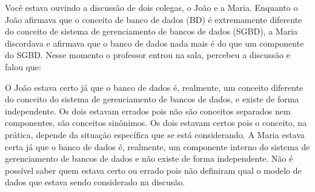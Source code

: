 \documentclass[12pt, addpoints]{exam}
\begin{document}
\begin{questions}
\question
Você estava ouvindo a discussão de dois colegas, o João e a Maria. Enquanto o
João afirmava que o conceito de banco de dados (BD) é extremamente diferente do
conceito de sistema de gerenciamento de bancos de dados (SGBD), a Maria
discordava e afirmava que o banco de dados nada mais é do que um componente do
SGBD. Nesse momento o professor entrou na sala, percebeu a discussão e falou
que:
\begin{choices}
\choice O João estava certo já que o banco de dados é, realmente, um conceito diferente do conceito do sistema de gerenciamento de bancos de dados, e existe de forma independente.
\choice Os dois estavam errados pois não são conceitos separados nem componentes, são conceitos sinônimos.
\choice Os dois estavam certos pois o conceito, na prática, depende da situação específica que se está considerando.
\choice A Maria estava certa já que o banco de dados é, realmente, um componente interno do sistema de gerenciamento de bancos de dados e não existe de forma independente.
\choice Não é possível saber quem estava certo ou errado pois não definiram qual o modelo de dados que estava sendo considerado na discusão.
\end{choices}



    \end{questions}
    
\end{document}
